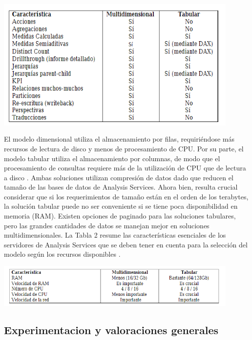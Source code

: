 \documentclass[preprint,12pt]{elsarticle}
\begin{document}
\begin{center}
	\includegraphics[width=12cm]{./Imagenes/ang4} 
\end{center}

El modelo dimensional utiliza el almacenamiento por filas, requiriéndose más recursos de lectura de disco y  menos  de  procesamiento  de  CPU.  Por  su  parte,  el  modelo  tabular  utiliza  el  almacenamiento  por columnas, de modo que el procesamiento de consultas requiere  más de la  utilización  de CPU  que de lectura a disco . Ambas soluciones utilizan compresión de datos dado que reducen el tamaño de las bases de datos de Analysis Services. Ahora bien, resulta crucial considerar que si los requerimientos de tamaño están en el orden de los terabytes, la solución tabular puede no ser conveniente si se tiene poca disponibilidad en memoria (RAM). Existen opciones de paginado para las soluciones tabulares, pero las grandes cantidades de datos se manejan mejor en soluciones multidimensionales. La Tabla 2 resume las características  esenciales de  los servidores de  Analysis Services  que se  deben tener en  cuenta para  la selección del modelo según los recursos disponibles . 

\begin{center}
	\includegraphics[width=12cm]{./Imagenes/ang5} 
\end{center}

\subsection{Experimentacion y valoraciones generales}
\end{document}
